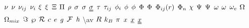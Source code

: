 \begin{mdframed}
$\freq$ \newline
$\kinvisc$ \newline
$\stoich$ \newline
$\chargeval$ \newline
$\conjcoortwo$ \newline
$\extent$ \newline
$\gcpf$ \newline
$\osmpress$ \newline
$\dens$ \newline
$\symfac$ \newline
$\molecrad$ \newline
$\stresstens$ \newline
$\torque$ \newline
$\shear$ \newline
$\fhmolefrac$ \newline
$\fugcoeff$ \newline
$\eleccoeff$ \newline
$\pot$ \newline
$\diss$ \newline
$\potfunc$ \newline
$\fftbasis$ \newline
$\fhparam$ \newline
$\streamfunc$ \newline
$\dlesselecpot$ \newline
$\mpf$ \newline
$\accentfac$ \newline
$\elecdegen$ \newline
$\mpc$ \newline
$\combmixfunc$ \newline
$\dof$ \newline
$\dynpress$ \newline
$\surfreac$ \newline
$\lightspeed$ \newline
$\e$ \newline
$\grav$ \newline
$\faraday$ \newline
$\planck$ \newline
  \textbackslash av \newline
$\gasconst$ \newline
$\boltz$ \newline
$\pie$ \newline
$\exscal$ \newline
$\exvecone$ \newline
$\exvectwo$ \newline

\end{mdframed}
